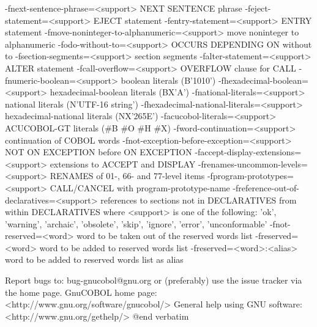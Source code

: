   -fnext-sentence-phrase=<support>	NEXT SENTENCE phrase
  -feject-statement=<support>	EJECT statement
  -fentry-statement=<support>	ENTRY statement
  -fmove-noninteger-to-alphanumeric=<support>	move noninteger to alphanumeric
  -fodo-without-to=<support>	OCCURS DEPENDING ON without to
  -fsection-segments=<support>	section segments
  -falter-statement=<support>	ALTER statement
  -fcall-overflow=<support>	OVERFLOW clause for CALL
  -fnumeric-boolean=<support>	boolean literals (B'1010')
  -fhexadecimal-boolean=<support>	hexadecimal-boolean literals (BX'A')
  -fnational-literals=<support>	national literals (N'UTF-16 string')
  -fhexadecimal-national-literals=<support>	hexadecimal-national literals (NX'265E')
  -facucobol-literals=<support>	ACUCOBOL-GT literals (#B #O #H #X)
  -fword-continuation=<support>	continuation of COBOL words
  -fnot-exception-before-exception=<support>	NOT ON EXCEPTION before ON EXCEPTION
  -faccept-display-extensions=<support>	extensions to ACCEPT and DISPLAY
  -frenames-uncommon-levels=<support>	RENAMES of 01-, 66- and 77-level items
  -fprogram-prototypes=<support>	CALL/CANCEL with program-prototype-name
  -freference-out-of-declaratives=<support>	references to sections not in DECLARATIVES from within DECLARATIVES
	where <support> is one of the following:
	'ok', 'warning', 'archaic', 'obsolete', 'skip', 'ignore', 'error', 'unconformable'
  -fnot-reserved=<word>	word to be taken out of the reserved words list
  -freserved=<word>    	word to be added to reserved words list
  -freserved=<word>:<alias>	word to be added to reserved words list as alias


Report bugs to: bug-gnucobol@gnu.org
or (preferably) use the issue tracker via the home page.
GnuCOBOL home page: <http://www.gnu.org/software/gnucobol/>
General help using GNU software: <http://www.gnu.org/gethelp/>
@end verbatim


